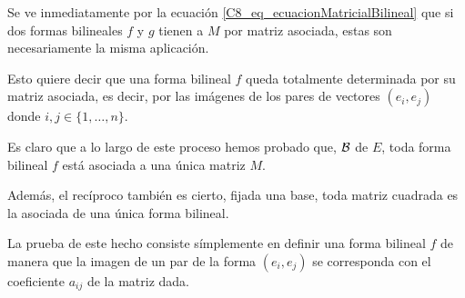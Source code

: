 Se ve inmediatamente por la ecuación \eqref{C8_eq_ecuacionMatricialBilineal} que si dos formas bilineales $f$ y $g$ tienen a $M$ por matriz asociada, estas son necesariamente la misma aplicación.

Esto quiere decir que una forma bilineal $f$ queda totalmente determinada por su matriz asociada, es decir, por las imágenes de los pares de vectores $(e_i,e_j)$ donde $i,j\in\{1,\dots,n\}$.

\begin{obs}
	\label{C8_obs_correspondencia}
	Es claro que a lo largo de este proceso hemos probado que,  $\mathcal{B}$ de $E$, toda forma bilineal $f$ está asociada a una única matriz $M$.
	
	Además, el recíproco también es cierto, fijada una base, toda matriz cuadrada es la asociada de una única forma bilineal.
	
	La prueba de este hecho consiste símplemente en definir una forma bilineal $f$ de manera que la imagen de un par de la forma $(e_i,e_j)$ se corresponda con el coeficiente $a_{ij}$ de la matriz dada. 
\end{obs}
